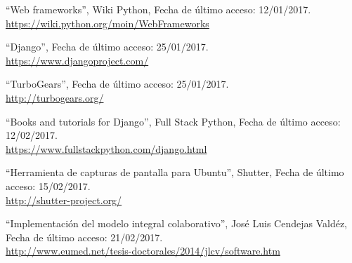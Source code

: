 

``Web frameworks'', Wiki Python, Fecha de último acceso: 12/01/2017.\\\href{https://wiki.python.org/moin/WebFrameworks}{https://wiki.python.org/moin/WebFrameworks}

``Django'', Fecha de último acceso: 25/01/2017.\\\href{https://www.djangoproject.com/}{https://www.djangoproject.com/}

``TurboGears'', Fecha de último acceso: 25/01/2017.\\\href{http://turbogears.org/}{http://turbogears.org/}

``Books and tutorials for Django'', Full Stack Python, Fecha de último acceso: 12/02/2017.\\\href{https://www.fullstackpython.com/django.html}{https://www.fullstackpython.com/django.html}

``Herramienta de capturas de pantalla para Ubuntu'', Shutter, Fecha de último acceso: 15/02/2017.\\\href{http://shutter-project.org/}{http://shutter-project.org/}

``Implementación del modelo integral colaborativo'', José Luis Cendejas Valdéz, Fecha de último acceso: 21/02/2017.\\\href{http://www.eumed.net/tesis-doctorales/2014/jlcv/software.htm}{http://www.eumed.net/tesis-doctorales/2014/jlcv/software.htm}



